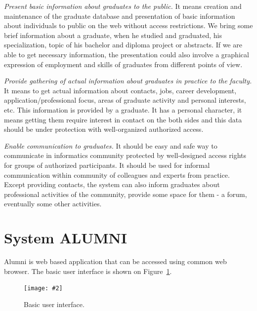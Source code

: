 \documentclass{iitsrc}[2006/14/02]
\newcommand\fig[4]{%
	\begin{figure}[h]
	\begin{center}
	\texttt{[image: \#2]}
	~\\%
	\caption{#4}
	\label{#3}
	\end{center}
	\end{figure}
}
\begin{document}
{\em Present basic information about graduates to the public.}
It means creation and maintenance of the graduate database and presentation of basic information about individuals to public on the web without access restrictions. We bring some brief information about a graduate, when he studied and graduated, his specialization, topic of his bachelor and diploma project or abstracts. If we are able to get necessary information, the presentation could also involve a graphical expression of employment and skills of graduates from different points of view.

{\em Provide gathering of actual information about graduates in practice to the faculty.} 
It means to get actual information about contacts, jobs, career development, application/professional focus, areas of graduate activity and personal interests, etc. This information is provided by a graduate. It has a personal character, it means getting them require interest in contact on the both sides and this data should be under protection with well-organized authorized access.

{\em Enable communication to graduates.}
It should be easy and safe way to communicate in informatics community protected by well-designed access rights for groups of authorized participants. It should be used for informal communication within community of colleagues and experts from practice. Except providing contacts, the system can also inform graduates about professional activities of the community, provide some space for them - a forum, eventually some other activities.


\section{System ALUMNI}

Alumni is web based application that can be accessed using common web browser. The basic user interface is shown on Figure~\ref{fig:scr1}. 

\fig{width=12cm, bb = 0 0 831 683}{images/screen1.png}{fig:scr1}{Basic user interface.}
\end{document}
